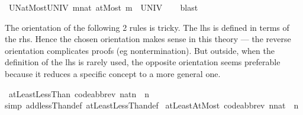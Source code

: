 \begin{isabellebody}
\ UN{\isacharunderscore}{\kern0pt}atMost{\isacharunderscore}{\kern0pt}UNIV{\isacharcolon}{\kern0pt}\ {\isachardoublequoteopen}{\isacharparenleft}{\kern0pt}{\isasymUnion}m{\isacharcolon}{\kern0pt}{\isacharcolon}{\kern0pt}nat{\isachardot}{\kern0pt}\ atMost\ m{\isacharparenright}{\kern0pt}\ {\isacharequal}{\kern0pt}\ UNIV{\isachardoublequoteclose}\isanewline
%
\isadelimproof
\ \ %
\endisadelimproof
%
\isatagproof
{}\isamarkupfalse%
\ blast%
\endisatagproof
{\isafoldproof}%
%
\isadelimproof
%
\endisadelimproof
%
\isadelimdocument
%
\endisadelimdocument
%
\isatagdocument
%
\isamarkuptrue%
%
\endisatagdocument
{\isafolddocument}%
%
\isadelimdocument
%
\endisadelimdocument
%
\begin{isamarkuptext}%
The orientation of the following 2 rules is tricky. The lhs is
defined in terms of the rhs.  Hence the chosen orientation makes sense
in this theory --- the reverse orientation complicates proofs (eg
nontermination). But outside, when the definition of the lhs is rarely
used, the opposite orientation seems preferable because it reduces a
specific concept to a more general one.%
\end{isamarkuptext}\isamarkuptrue%
\isamarkupfalse%
\ atLeast{}LessThan\ {\isacharbrackleft}{\kern0pt}code{\isacharunderscore}{\kern0pt}abbrev{\isacharbrackright}{\kern0pt}{\isacharcolon}{\kern0pt}\ {\isachardoublequoteopen}{\isacharbraceleft}{\kern0pt}{}{\isacharcolon}{\kern0pt}{\isacharcolon}{\kern0pt}nat{\isachardot}{\kern0pt}{\isachardot}{\kern0pt}{\isacharless}{\kern0pt}n{\isacharbraceright}{\kern0pt}\ {\isacharequal}{\kern0pt}\ {\isacharbraceleft}{\kern0pt}{\isachardot}{\kern0pt}{\isachardot}{\kern0pt}{\isacharless}{\kern0pt}n{\isacharbraceright}{\kern0pt}{\isachardoublequoteclose}\isanewline
%
\isadelimproof
\ \ %
\endisadelimproof
%
\isatagproof
{}\isamarkupfalse%
{\isacharparenleft}{\kern0pt}simp\ add{\isacharcolon}{\kern0pt}lessThan{\isacharunderscore}{\kern0pt}def\ atLeastLessThan{\isacharunderscore}{\kern0pt}def{\isacharparenright}{\kern0pt}%
\endisatagproof
{\isafoldproof}%
%
\isadelimproof
\isanewline
%
\endisadelimproof
\isanewline
{}\isamarkupfalse%
\ atLeast{}AtMost\ {\isacharbrackleft}{\kern0pt}code{\isacharunderscore}{\kern0pt}abbrev{\isacharbrackright}{\kern0pt}{\isacharcolon}{\kern0pt}\ {\isachardoublequoteopen}{\isacharbraceleft}{\kern0pt}{}{\isachardot}{\kern0pt}{\isachardot}{\kern0pt}n{\isacharcolon}{\kern0pt}{\isacharcolon}{\kern0pt}nat{\isacharbraceright}{\kern0pt}\ {\isacharequal}{\kern0pt}\ {\isacharbraceleft}{\kern0pt}{\isachardot}{\kern0pt}{\isachardot}{\kern0pt}n{\isacharbraceright}{\kern0pt}{\isachardoublequoteclose}\isanewline

\end{isabellebody}
